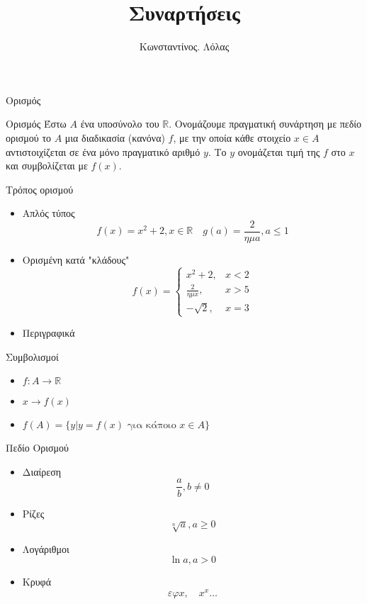 \documentclass[greek]{beamer}
\title{Συναρτήσεις}
\author[Λόλας]{Κωνσταντίνος. Λόλας}
\begin{document}
\begin{frame}
 \titlepage
\end{frame}
\begin{frame}{Ορισμός}
 \begin{block}{Ορισμός}
  Έστω $Α$ ένα υποσύνολο του $\mathbb{R}$. Ονομάζουμε πραγματική συνάρτηση με πεδίο ορισμού το $Α$ μια διαδικασία (κανόνα) $f$, με την οποία κάθε στοιχείο $x\in A$ αντιστοιχίζεται σε ένα μόνο πραγματικό αριθμό $y$. Το $y$ ονομάζεται τιμή της $f$ στο $x$ και συμβολίζεται με $f(x)$.
 \end{block}
\end{frame}

\begin{frame}{Τρόπος ορισμού}
 \begin{itemize}
  \item<1-> Απλός τύπος
        $$f(x)=x^2+2,x\in\mathbb{R}\quad g(a)=\frac{2}{ημa}, a\le1$$
  \item<2-> Ορισμένη κατά "κλάδους"
        $$
         f(x)=
         \begin{cases}
          x^2+2,         & x<2 \\
          \frac{2}{ημx}, & x>5 \\
          -\sqrt{2},     & x=3
         \end{cases}
        $$
  \item<3-> Περιγραφικά
 \end{itemize}
\end{frame}

\begin{frame}{Συμβολισμοί}
 \begin{itemize}
  \item $f:A\to\mathbb{R}$
  \item $x\to f(x)$
  \item $f(A)=\{y| y=f(x)\text{ για κάποιο }x\in A\}$
 \end{itemize}
\end{frame}

\begin{frame}{Πεδίο Ορισμού}
 \begin{itemize}
  \item<1-> Διαίρεση
        $$\frac{a}{b},b\ne 0$$
  \item<2-> Ρίζες
        $$\sqrt[n]{a},a\ge 0$$
  \item<3-> Λογάριθμοι
        $$\ln a,a > 0$$
  \item<4-> Κρυφά
        $$εφx,\quad x^x\ldots$$
 \end{itemize}
\end{frame}
\end{document}
